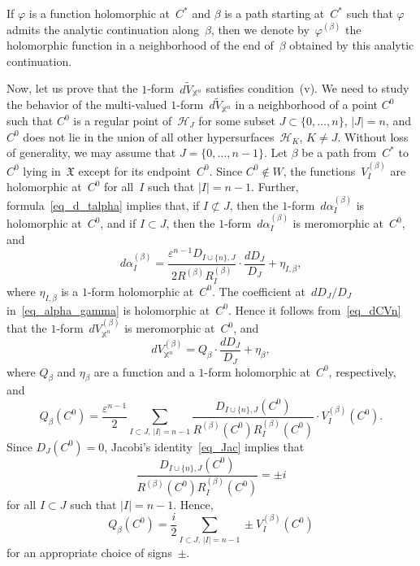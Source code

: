 \documentclass[reqno,tbtags,12pt]{amsart}
\numberwithin{equation}{section}
\newcommand{\CH}{\mathcal{H}}
\newcommand{\X}{\mathbb{X}}
\newcommand{\FX}{\mathfrak{X}}
\newcommand{\tV}{\widetilde{V}}
\theoremstyle{definition}
\begin{document}
If $\varphi$ is a function holomorphic at~$C^*$ and $\beta$ is a path  starting at~$C^*$ such that $\varphi$ admits the  analytic continuation along~$\beta$, then we  denote by~$\varphi^{(\beta)}$ the holomorphic function in a neighborhood of the end of~$\beta$ obtained by this analytic continuation.


Now, let us prove that the $1$-form~$d\tV_{\X^n}$ satisfies condition~(v). We need to study the behavior of the multi-valued $1$-form~$d\tV_{\X^n}$ in a neighborhood of a point $C^0$ such that $C^0$ is a regular point of~$\CH_J$ for some subset $J\subset\{0,\ldots,n\}$, $|J|=n$, and $C^0$ does not lie in the union of all other hypersurfaces~$\CH_K$, $K\ne J$. Without loss of generality, we may assume that $J=\{0,\ldots,n-1\}$. Let $\beta$ be a path from~$C^*$ to~$C^0$ lying in~$\FX$ except for its endpoint~$C^0$.  Since $C^0\notin W$, the functions~$V_I^{(\beta)}$  are holomorphic at~$C^0$ for all~$I$ such that $|I|=n-1$. Further, formula~\eqref{eq_d_talpha} implies that, if  $I\not\subset J$, then the $1$-form~$d\alpha_I^{(\beta)}$ is holomorphic at~$C^0$, and if $I\subset J$, then the $1$-form~$d\alpha_I^{(\beta)}$ is meromorphic at~$C^0$, and 
\begin{equation}\label{eq_alpha_gamma}
d\alpha^{(\beta)}_I=\frac{\varepsilon^{n-1}D_{I\cup\{n\},J}}{2R^{(\beta)}R^{(\beta)}_I}\cdot\frac{dD_J}{D_J}+\eta_{I,\beta},
\end{equation}
where $\eta_{I,\beta}$ is a $1$-form holomorphic at~$C^0$. The coefficient at~$dD_J/D_J$ in~\eqref{eq_alpha_gamma} is holomorphic at~$C^0$. Hence it follows from~\eqref{eq_dCVn} that the $1$-form~$dV_{\X^n}^{(\beta)}$ is meromorphic at~$C^0$, and 
\begin{equation}\label{eq_d_V_gamma}
dV_{\X^n}^{(\beta)}=Q_{\beta}\cdot\frac{dD_J}{D_J}+\eta_{\beta},
\end{equation}
where $Q_{\beta}$ and $\eta_{\beta}$ are a function and a $1$-form holomorphic at~$C^0$, respectively, and
\begin{equation}\label{eq_Q_beta}
Q_{\beta}(C^0)=\frac{\varepsilon^{n-1}}{2}\sum_{I\subset J,\,|I|=n-1}\frac{D_{I\cup\{n\},J}(C^0)}{R^{(\beta)}(C^0)R^{(\beta)}_I(C^0)}\cdot V_I^{(\beta)}(C^0).
\end{equation}
Since $D_J(C^0)=0$, Jacobi's identity~\eqref{eq_Jac} implies that
\begin{equation*}
\frac{D_{I\cup\{n\},J}(C^0)}{R^{(\beta)}(C^0)R^{(\beta)}_I(C^0)}=\pm i
\end{equation*}
for all $I\subset J$ such that $|I|=n-1$. Hence, 
\begin{equation}\label{eq_Q_beta_new}
Q_{\beta}(C^0)=\frac{i}{2}\sum_{I\subset J,\,|I|=n-1}\pm V_I^{(\beta)}(C^0)
\end{equation}
for an appropriate choice of signs~$\pm$.
\end{document}
